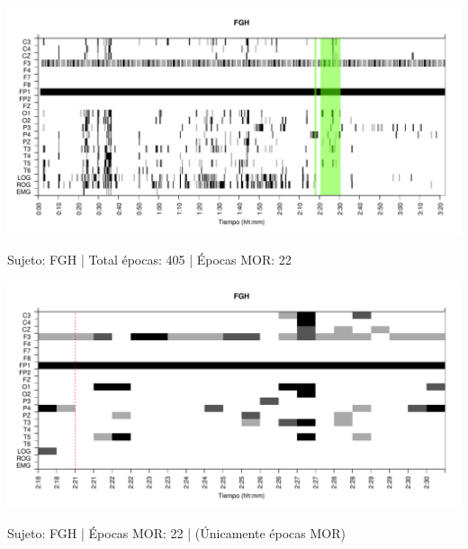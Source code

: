 \begin{SidewaysFigure}
\centering
\includegraphics[width=\linewidth]
{./material_bonito170220/FGHSUE_22_mor22_tot405_est_total.pdf} 
\caption{Sujeto: FGH | Total \'epocas: 405 | \'Epocas MOR: 22}
\end{SidewaysFigure}
\begin{SidewaysFigure}
\centering
\includegraphics[width=\linewidth]
{./material_bonito170220/FGHSUE_22_mor22_tot22_est_mor.pdf} 
\caption{Sujeto: FGH | \'Epocas MOR: 22 | (\'Unicamente \'epocas MOR)}
\end{SidewaysFigure}


